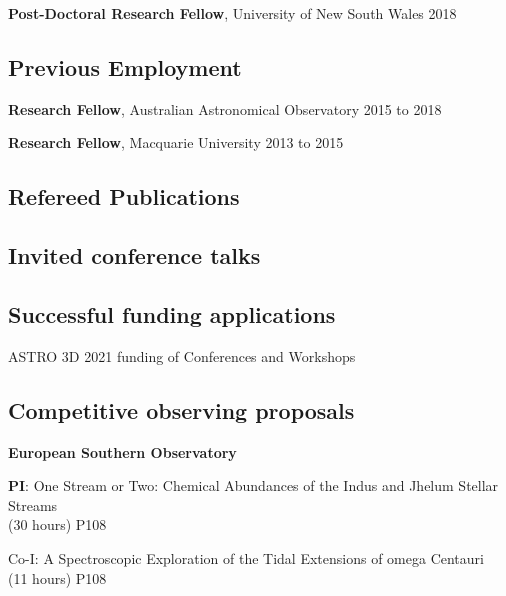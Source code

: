 \documentclass[10pt]{article}
\newcommand{\cvlist}{}
\begin{document}
\textbf{Post-Doctoral Research Fellow},
            University of New South Wales
            \hfill {2018}

\vspace{0.1in}

\subsection*{Previous Employment}

\textbf{Research Fellow},
            Australian Astronomical Observatory
            \hfill {2015 to 2018}

\textbf{Research Fellow},
            Macquarie University
            \hfill {2013 to 2015}

\vspace{0.1in}

\subsection*{Refereed Publications}

\begin{list}{}{\cvlist}

\end{list}

% 

\subsection*{Invited conference talks}
\begin{list}{}{\cvlist}

\end{list}

\subsection*{Successful funding applications}
\begin{innerlist}
  \item ASTRO 3D 2021 funding of Conferences and Workshops
\end{innerlist}

\subsection*{Competitive observing proposals}
\textbf{European Southern Observatory}
\begin{innerlist}
\item \textbf{PI}: One Stream or Two: Chemical Abundances of the Indus and Jhelum Stellar Streams\\ (30 hours)  \hfill{P108}
\item Co-I: A Spectroscopic Exploration of the Tidal Extensions of omega Centauri\\ (11 hours)  \hfill{P108}
\end{innerlist}
\end{document}
